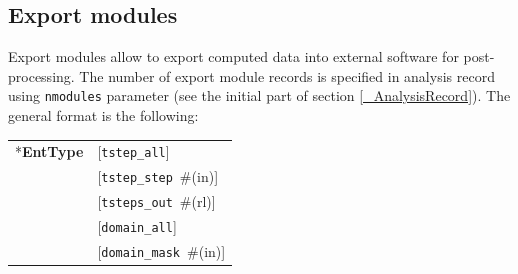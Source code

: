 \documentclass[a4paper]{article}
\makeatletter
\newcommand{\param}[1]{\texttt{#1}} %
\newcommand{\optional}[1]{[#1]} %
\newcommand{\field}[2]{\param{#1}~\#{\tiny(#2)}} %
\newcommand{\optField}[2]{\optional{\field{#1}{#2}}}
\newcommand{\fieldnotype}[1]{\param{#1}}
\newcommand{\entKeyword}[1]{*\textbf{#1}} %
\newenvironment{record}[1][]{\begin{tabular}{|ll}}{\end{tabular}\\}
\newcommand{\recentry}[2]{{#1}&{#2}\\}
\newcounter{rcc}
\newenvironment{record}[1][\textwidth]{\setcounter{rcc}{0}\begin{tabular*}{#1}{|ll@{\extracolsep{\fill}}r}}{\end{tabular*}\\}
\newcommand{\recentry}[2]{\ifthenelse{\value{rcc}>0}{&$\backslash$ \\}{\setcounter{rcc}{1}}{#1}&{#2}}
\makeatother
\begin{document}
\subsection{Export modules}
\label{ExportModulesSec}
Export modules allow to export computed data into external software for
post-processing. The number of export module records is specified in
analysis record using \param{nmodules} parameter (see the initial part of section \ref{_AnalysisRecord}). The general format
is the following:\\
\begin{record}
  \recentry{\entKeyword{EntType}}{[\fieldnotype{tstep\_all}]}
  \recentry{}{\optField{tstep\_step}{in}}
  \recentry{}{\optField{tsteps\_out}{rl}}
  \recentry{}{[\fieldnotype{domain\_all}]}
  \recentry{}{\optField{domain\_mask}{in}}
\end{record}
\end{document}
